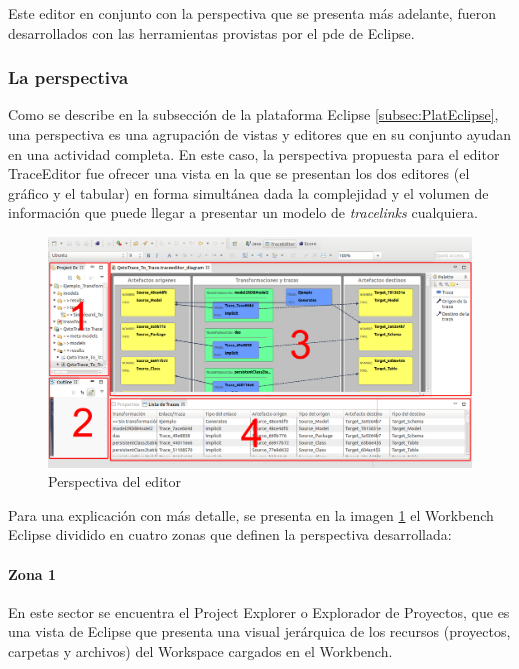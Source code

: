 \documentclass[a4paper,12pt,twoside,spanish,openright]{book}
\begin{document}
Este editor en conjunto con la perspectiva que se presenta más adelante, fueron desarrollados con las herramientas provistas por el \gls{pde} de \textsf{Eclipse}.


\subsubsection{La perspectiva}

Como se describe en la subsección de la plataforma \textsf{Eclipse} \ref{subsec:PlatEclipse}, una perspectiva es una agrupación de vistas y editores que en su conjunto ayudan en una actividad completa. En este caso, la perspectiva propuesta para el editor \textsf{TraceEditor} fue ofrecer una vista en la que se presentan los dos editores (el gráfico y el tabular) en forma simultánea dada la complejidad y el volumen de información que puede llegar a presentar un modelo de \textit{tracelinks} cualquiera.


\begin{figure}[hbtp]
\centering
\includegraphics[scale=.29]{./img/TraceEditorPerspectiva}
\caption{Perspectiva del editor}
\label{fig:TraceEditorPerspectiva}
\end{figure}


Para una explicación con más detalle, se presenta en la imagen \ref{fig:TraceEditorPerspectiva} el Workbench \textsf{Eclipse} dividido en cuatro zonas que definen la perspectiva desarrollada:


\paragraph{Zona 1}
En este sector se encuentra el \textsf{Project Explorer} o Explorador de Proyectos, que es una vista de \textsf{Eclipse} que presenta una visual jerárquica de los recursos (proyectos, carpetas y archivos) del Workspace cargados en el Workbench.
\end{document}
